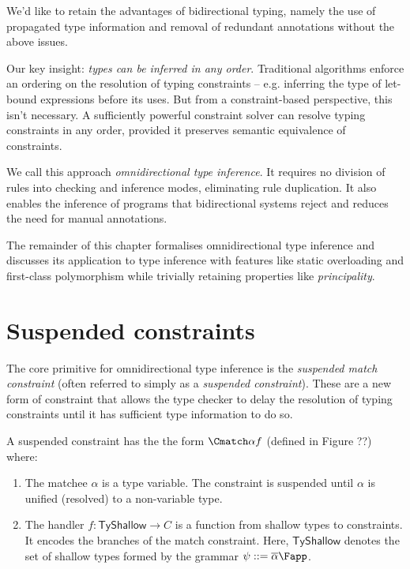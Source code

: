 We'd like to retain the advantages of bidirectional typing, namely the use of propagated type information and removal of redundant annotations without the above issues. 

Our key insight: \textit{types can be inferred in any order}. Traditional algorithms enforce an ordering on the resolution of typing constraints -- e.g. inferring 
the type of let-bound expressions before its uses. But from a constraint-based perspective, this isn't necessary. A sufficiently powerful constraint solver 
can resolve typing constraints in any order, provided it preserves semantic equivalence of constraints. 

We call this approach \textit{omnidirectional type inference}. It requires no division of rules into checking and inference modes, eliminating rule duplication. 
It also enables the inference of programs that bidirectional systems reject and reduces the need for manual annotations. 

The remainder of this chapter formalises omnidirectional type inference and discusses its application to \ML type inference with features like 
static overloading and first-class polymorphism while trivially retaining properties like \textit{principality}. 





\section{Suspended constraints}

The core primitive for omnidirectional type inference is the \textit{suspended match constraint} (often referred to simply as a \textit{suspended constraint}). 
These are a new form of constraint that allows the type checker to delay the resolution of typing constraints until it has sufficient type information to do so. 

A suspended constraint has the the form $\Cmatch \alpha f$ (defined in Figure ??) where:
\begin{enumerate}
  \item The matchee $\alpha$ is a type variable. The constraint is suspended until $\alpha$ is unified (resolved) to a non-variable type. 
  \item The handler $f : \mathsf{TyShallow} \to C$ is a function from shallow types to constraints. It encodes the branches of the 
  match constraint. Here, $\mathsf{TyShallow}$ denotes the set of shallow types formed by the grammar $\psi ::= \overline{\alpha} \Fapp$. 
\end{enumerate} 

